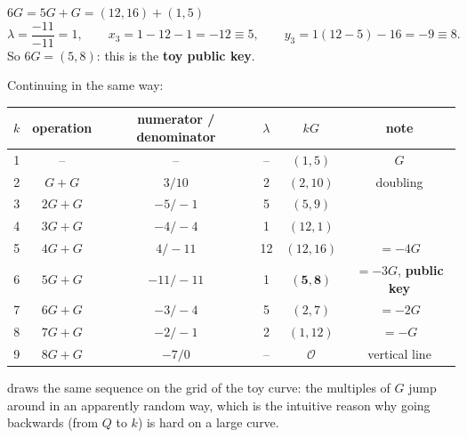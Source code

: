 \begin{framedex}{$6G = 5G + G = (12,16) + (1,5)$}
  \[
    \lambda = \frac{-11}{-11} = 1, \qquad
    x_3 = 1 - 12 - 1 = -12 \equiv 5, \qquad
    y_3 = 1(12 - 5) - 16 = -9 \equiv 8 .
  \]
  So $6G = (5, 8)$: this is the \textbf{toy public key}.
\end{framedex}

Continuing in the same way:

\begin{center}
  \begin{tabular}{c c c c c c}
    \toprule
    $k$ & operation & numerator / denominator & $\lambda$ & $kG$ & note \\
    \midrule
    1 & -- & -- & -- & $(1, 5)$ & $G$ \\
    2 & $G + G$ & $3 / 10$ & 2 & $(2, 10)$ & doubling \\
    3 & $2G + G$ & $-5 / -1$ & 5 & $(5, 9)$ & \\
    4 & $3G + G$ & $-4 / -4$ & 1 & $(12, 1)$ & \\
    5 & $4G + G$ & $4 / -11$ & 12 & $(12, 16)$ & $= -4G$ \\
    6 & $5G + G$ & $-11 / -11$ & 1 & $\mathbf{(5, 8)}$ & $= -3G$, \textbf{public key} \\
    7 & $6G + G$ & $-3 / -4$ & 5 & $(2, 7)$ & $= -2G$ \\
    8 & $7G + G$ & $-2 / -1$ & 2 & $(1, 12)$ & $= -G$ \\
    9 & $8G + G$ & $-7 / 0$ & -- & $\mathcal{O}$ & vertical line \\
    \bottomrule
  \end{tabular}
\end{center}

 draws the same sequence on the grid of the toy curve: the multiples of $G$ jump around in an apparently random way, which is the intuitive reason why going backwards (from $Q$ to $k$) is hard on a large curve.

